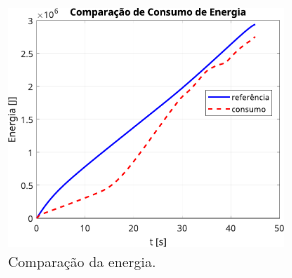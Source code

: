 \begin{figure}[H]
    \centering
    \includegraphics[width=0.65\textwidth]{Cap4/figuras/evtol-comparacao-energia.pdf}
    \caption{Comparação da energia.}
    \label{fig:resultados-evtol-comparacao-energia}
\end{figure}
